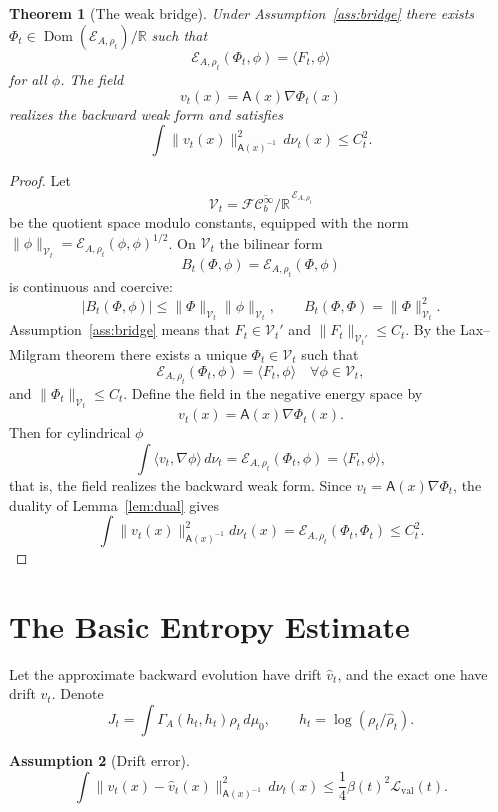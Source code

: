 \documentclass{article}
\newtheorem{theorem}{Theorem}[section]
\newtheorem{assumption}[theorem]{Assumption}
\newcommand{\Eval}{\mathcal L_{\mathrm{val}}}
\newcommand{\Asf}{\mathsf A}
\newcommand{\Dom}{\operatorname{Dom}}
\newcommand{\FC}{\mathcal{FC}_b^\infty}
\begin{document}
\begin{theorem}[The weak bridge]
\label{thm:bridge}
Under Assumption~\ref{ass:bridge} there exists
\(\Phi_t\in\Dom(\mathcal E_{A,\rho_t})/\mathbb R\) such that
\[
        \mathcal E_{A,\rho_t}(\Phi_t,\phi)=\langle F_t,\phi\rangle
\]
for all \(\phi\). The field
\[
        v_t(x)=\Asf(x)\nabla\Phi_t(x)
\]
realizes the backward weak form and satisfies
\[
        \int\|v_t(x)\|_{\Asf(x)^{-1}}^2\,d\nu_t(x)
        \le C_t^2.
\]
\end{theorem}

\begin{proof}
Let
\[
        \mathcal V_t=\overline{\FC/\mathbb R}^{\,\mathcal E_{A,\rho_t}}
\]
be the quotient space modulo constants, equipped with the norm
\(\|\phi\|_{\mathcal V_t}=\mathcal E_{A,\rho_t}(\phi,\phi)^{1/2}\). On
\(\mathcal V_t\) the bilinear form
\[
        B_t(\Phi,\phi)=\mathcal E_{A,\rho_t}(\Phi,\phi)
\]
is continuous and coercive:
\[
        |B_t(\Phi,\phi)|\le \|\Phi\|_{\mathcal V_t}\|\phi\|_{\mathcal V_t},
        \qquad
        B_t(\Phi,\Phi)=\|\Phi\|_{\mathcal V_t}^2 .
\]
Assumption~\ref{ass:bridge} means that \(F_t\in\mathcal V_t'\) and
\(\|F_t\|_{\mathcal V_t'}\le C_t\). By the Lax--Milgram theorem there exists a
unique \(\Phi_t\in\mathcal V_t\) such that
\[
        \mathcal E_{A,\rho_t}(\Phi_t,\phi)=\langle F_t,
\phi\rangle
        \quad\forall\phi\in\mathcal V_t,
\]
and \(\|\Phi_t\|_{\mathcal V_t}\le C_t\). Define the field in the negative
energy space by
\[
        v_t(x)=\Asf(x)\nabla\Phi_t(x).
\]
Then for cylindrical \(\phi\)
\[
        \int\langle v_t,\nabla\phi\rangle\,d\nu_t
        =\mathcal E_{A,\rho_t}(\Phi_t,
\phi)=\langle F_t,
\phi\rangle,
\]
that is, the field realizes the backward weak form. Since \(v_t=\Asf(x)\nabla\Phi_t\), the duality of
Lemma~\ref{lem:dual} gives
\[
        \int\|v_t(x)\|_{\Asf(x)^{-1}}^2d\nu_t(x)
        =\mathcal E_{A,\rho_t}(\Phi_t,
\Phi_t)
        \le C_t^2.
\]
\end{proof}

\section{The Basic Entropy Estimate}

Let the approximate backward evolution have drift \(\hat v_t\), and the exact
one have drift \(v_t\). Denote
\[
        J_t=\int\Gamma_A(h_t,h_t)\rho_t\,d\mu_0,
        \qquad h_t=\log(\rho_t/\hat\rho_t).
\]

\begin{assumption}[Drift error]
\label{ass:drift}
\[
        \int\|v_t(x)-\hat v_t(x)\|_{\Asf(x)^{-1}}^2\,d\nu_t(x)
        \le
        \frac14\beta(t)^2\Eval(t).
\]
\end{assumption}
\end{document}
